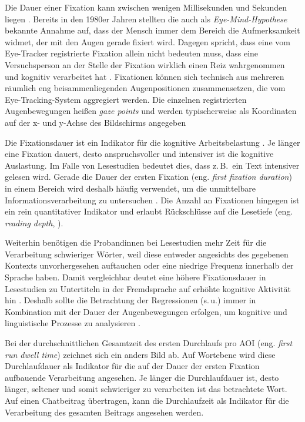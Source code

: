 Die Dauer einer Fixation kann zwischen wenigen Millisekunden und Sekunden liegen \citep[377\psq]{holmqvist_eye_2011}. Bereits in den 1980er Jahren stellten \citeauthor{just_theory_1980} die auch als \emph{Eye-Mind-Hypothese} bekannte Annahme auf, dass der Mensch immer dem Bereich die Aufmerksamkeit widmet, der mit den Augen gerade fixiert wird. Dagegen spricht, dass eine vom Eye-Tracker registrierte Fixation allein nicht bedeuten muss, dass eine Versuchsperson an der Stelle der Fixation wirklich einen Reiz wahrgenommen und kognitiv verarbeitet hat \citep[7]{bergstrom_eye_2014}. Fixationen können sich technisch aus mehreren räumlich eng beisammenliegenden Augenpositionen zusammensetzen, die vom Eye-Tracking-System aggregiert werden. Die einzelnen registrierten Augenbewegungen heißen \emph{gaze points} und werden typischerweise als Koordinaten auf der x- und y-Achse des Bildschirms angegeben \citep[7]{huang_visual_2014}

Die Fixationsdauer ist ein Indikator für die kognitive Arbeitsbelastung \citet[376\psq]{rayner_eye_1998}. Je länger eine Fixation dauert, desto anspruchsvoller und intensiver ist die kognitive Auslastung. Im Falle von Lesestudien bedeutet dies, dass z.\,B.\ ein Text intensiver gelesen wird. Gerade die Dauer der ersten Fixation (eng. \emph{first fixation duration}) in einem Bereich wird deshalb häufig verwendet, um die unmittelbare Informationsverarbeitung zu untersuchen \citep[384]{holmqvist_eye_2011}. Die Anzahl an Fixationen hingegen ist ein rein quantitativer Indikator und erlaubt Rückschlüsse auf die Lesetiefe (eng. \emph{reading depth}, \cite[390]{holmqvist_eye_2011}).

Weiterhin benötigen die Proband{\textperiodcentered}innen bei Lesestudien mehr Zeit für die Verarbeitung schwieriger Wörter, weil diese entweder angesichts des gegebenen Kontexts unvorhergesehen auftauchen oder eine niedrige Frequenz innerhalb der Sprache haben. Damit vergleichbar deutet eine höhere Fixationsdauer in Lesestudien zu Untertiteln in der Fremdsprache auf erhöhte kognitive Aktivität hin \citep[412]{bisson_processing_2014}. Deshalb sollte die Betrachtung der Regressionen (s.\,u.) immer in Kombination mit der Dauer der Augenbewegungen erfolgen, um kognitive und linguistische Prozesse zu analysieren \citep[2]{eskenazi_regressions_2017}.

Bei der durchschnittlichen Gesamtzeit des ersten Durchlaufs pro AOI (eng. \emph{first run dwell time}) zeichnet sich ein anders Bild ab. Auf Wortebene wird diese Durchlaufdauer als Indikator für die auf der Dauer der ersten Fixation aufbauende Verarbeitung angesehen. Je länger die Durchlaufdauer ist, desto länger, seltener und somit schwieriger zu verarbeiten ist das betrachtete Wort. Auf einen Chatbeitrag übertragen, kann die Durchlaufzeit als Indikator für die Verarbeitung des gesamten Beitrags angesehen werden.

